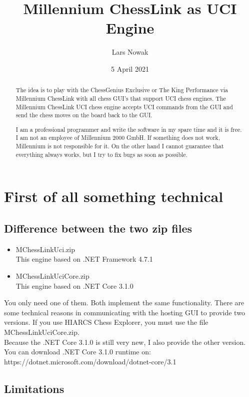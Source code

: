\documentclass[11pt,a4paper]{article}
\title{Millennium ChessLink as UCI Engine}
\author{Lars Nowak}
\date{5 April 2021}
\begin{document}
\maketitle

\begin{abstract}
The idea is to play with the ChessGenius Exclusive or The King Performance via Millennium ChessLink with all chess GUI’s that support UCI chess engines. The Millennium ChessLink UCI chess engine accepts UCI commands from the GUI and send the chess moves on the board back to the GUI.

I am a professional programmer and write the software in my spare time and it is free. I am not an employee of Millennium 2000 GmbH. If something does not work, Millennium is not responsible for it. On the other hand I cannot guarantee that everything always works, but I try to fix bugs as soon as possible.
\end{abstract}

\newpage
\tableofcontents
\newpage

\section{First of all something technical}

\subsection{Difference between the two zip files}
\begin{itemize}
\item MChessLinkUci.zip\\
This engine based on .NET Framework 4.7.1
\item MChessLinkUciCore.zip\\
This engine based on .NET Core 3.1.0
\end{itemize}
You only need one of them. Both implement the same functionality.
There are some technical reasons in communicating with the hosting GUI to provide two versions. 
If you use HIARCS Chess Explorer, you must use the file MChessLinkUciCore.zip.\\
Because the .NET Core 3.1.0 is still very new, I also provide the other version. You can download .NET Core 3.1.0 runtime on:\\ https://dotnet.microsoft.com/download/dotnet-core/3.1

\subsection{Limitations}
\end{document}

